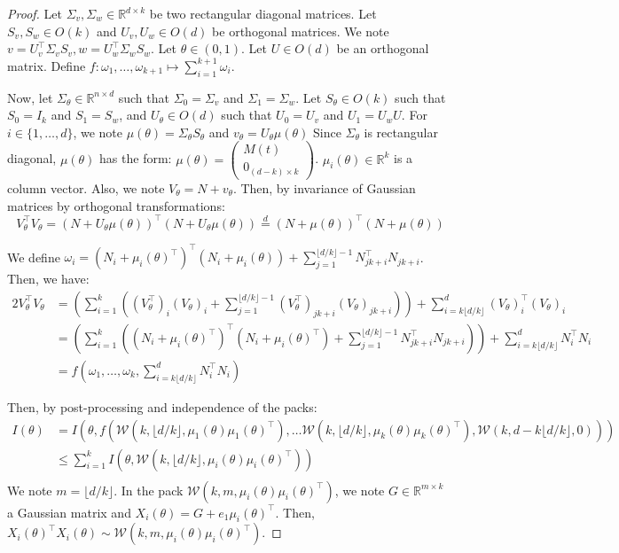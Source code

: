\documentclass{article}
\theoremstyle{plain}
\theoremstyle{definition}
\theoremstyle{remark}
\begin{document}
\begin{proof}
    Let $\Sigma_v, \Sigma_w \in \mathbb{R}^{d \times k}$ be two rectangular diagonal matrices. Let $S_v,S_w \in O(k)$ and $U_v, U_w \in O(d)$ be orthogonal matrices. We note $v = U_v^\top\Sigma_vS_v, w = U_w^\top\Sigma_wS_w$. Let $\theta \in (0,1)$. Let $U \in O(d)$ be an orthogonal matrix. Define $f : \omega_1,\dots, \omega_{k + 1} \mapsto \sum_{i=1}^{k+1} \omega_i$. 

    Now, let $\Sigma_\theta \in \mathbb{R}^{n \times d}$ such that $\Sigma_0 = \Sigma_v$ and $\Sigma_1 = \Sigma_w$. Let $S_\theta \in O(k)$ such that $S_0 = I_k$ and $S_1 = S_w$, and $U_\theta \in O(d)$ such that $U_0 = U_v$ and $U_1 = U_w U$. For $i \in \{1,\dots,d\}$, we note $\mu(\theta) =\Sigma_\theta S_\theta$ and $v_\theta = U_\theta\mu(\theta)$ Since $\Sigma_\theta$ is rectangular diagonal, $\mu(\theta)$ has the form: $\mu(\theta) = \begin{pmatrix} M(t) \\ 0_{(d-k)\times k}
    \end{pmatrix}$. $\mu_i(\theta) \in \mathbb{R}^{k}$ is a column vector. Also, we note $V_\theta = N + v_\theta$.
    Then, by invariance of Gaussian matrices by orthogonal transformations: \[V_\theta^\top V_\theta = (N+U_\theta\mu(\theta))^\top (N + U_\theta \mu(\theta)) \overset{d}{=}(N+\mu(\theta))^\top (N+\mu(\theta))\]

We define $\omega_i = (N_i+\mu_i(\theta)^\top)^\top (N_i+\mu_i(\theta))+ \sum_{j=1}^{\lfloor d/k \rfloor-1} N^\top_{jk + i} N_{jk+i}$. Then, we have:
\begin{alignat*}{2}
    V_\theta^\top V_\theta &= \left(\sum_{i=1}^{k} \left((V_\theta^\top)_i (V_\theta)_i + \sum_{j=1}^{\lfloor d/k \rfloor-1} (V_\theta^\top)_{jk + i} (V_\theta)_{jk+i}\right)\right) + \sum_{i=k\lfloor d/k \rfloor}^{d} (V_\theta)^\top_i (V_\theta)_i \\
    &= \left(\sum_{i=1}^{k} \left((N_i+\mu_i(\theta)^\top)^\top (N_i+\mu_i(\theta)^\top)+ \sum_{j=1}^{\lfloor d/k \rfloor-1} N^\top_{jk + i} N_{jk+i}\right)\right) + \sum_{i=k\lfloor d/k \rfloor}^{d} N^\top_i N_i\\
    &= f\left(\omega_1,\dots,\omega_k, \sum_{i=k\lfloor d/k \rfloor}^{d} N^\top_i N_i\right)
\end{alignat*}

Then, by post-processing and independence of the packs:
\begin{align*}
    I(\theta) &= I(\theta,f(\mathcal{W}(k,\lfloor d/k \rfloor,\mu_1(\theta) \mu_1(\theta)^\top), \dots \mathcal{W}(k,\lfloor d/k \rfloor,\mu_k(\theta) \mu_k(\theta)^\top),\mathcal{W}(k,d-k\lfloor d/k \rfloor,0)))\\
    & \leq \sum_{i=1}^{k} I(\theta, \mathcal{W}(k,\lfloor d/k \rfloor,\mu_i(\theta)\mu_i(\theta)^\top))\\
\end{align*}
We note $m = \lfloor d/k \rfloor$. In the pack $ \mathcal{W}(k,m,\mu_i(\theta) \mu_i(\theta)^\top)$, we note $G \in \mathbb{R}^{m \times k}$ a Gaussian matrix and $X_i(\theta) = G + e_1\mu_i(\theta)^\top$. Then, $X_i(\theta)^\top X_i(\theta) \sim  \mathcal{W}(k,m,\mu_i(\theta) \mu_i(\theta)^\top)$.



\end{proof}
\end{document}
